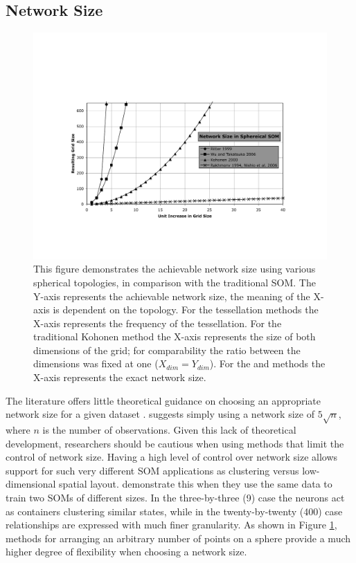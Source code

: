 \documentclass[10pt,titlepage]{article}
\begin{document}
\subsection{Network Size}
\begin{figure}
\centering
\includegraphics[width=\linewidth]{networkSize.pdf}
\caption{This figure demonstrates the achievable network size using various
spherical topologies, in comparison with the traditional SOM. The Y-axis represents the achievable network size, the
meaning of the X-axis is dependent on the topology. For the tessellation
methods the X-axis represents the frequency of the tessellation. For the
traditional Kohonen method the X-axis represents the size of both dimensions of
the grid; for comparability the ratio between the dimensions was fixed at one
($X_{dim}=Y_{dim}$).  For the \cite{Rakhmanov94} and \cite{Nishio:2006fk} methods the X-axis
represents the exact network size.}
\label{fig:nSize}
\end{figure}
The literature offers little theoretical guidance on choosing an appropriate
network size for a given dataset \citep{cho1996}.  \cite{toolbox} suggests
simply using a network size of \(5\sqrt {n}\), where \(n\) is the number of
observations. Given this lack of theoretical development, researchers should be
cautious when using methods that limit the control of network size.  Having a
high level of control over network size allows support for such very
different SOM applications as clustering versus low-dimensional spatial layout.
\cite{skupin07} demonstrate this when they use the same data to train two SOMs
of different sizes.  In the three-by-three (9) case the neurons act as
containers clustering similar states, while in the twenty-by-twenty (400) case
relationships are expressed with much finer granularity. As shown in
Figure \ref{fig:nSize}, methods for arranging an arbitrary number of points on a
sphere provide a much higher degree of flexibility when choosing a network
size.
\end{document}
